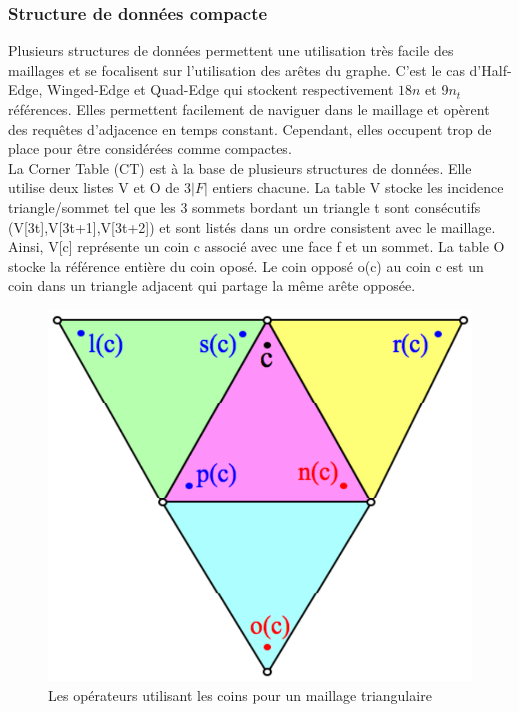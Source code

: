 \documentclass[a4paper,11pt,openany]{article}
\begin{document}
\subsubsection{Structure de données compacte}
\noindent
Plusieurs structures de données permettent une utilisation très facile des maillages et se focalisent sur l'utilisation des arêtes du graphe. C'est le cas d'Half-Edge, Winged-Edge et Quad-Edge qui stockent respectivement $18n$ et 9$n_t$ références. Elles permettent facilement de naviguer dans le maillage et opèrent des requêtes d'adjacence en temps constant. Cependant, elles occupent trop de place pour être considérées comme compactes.\\
La Corner Table (CT) est à la base de plusieurs structures de données. Elle utilise deux listes V et O de $3|F|$ entiers chacune. La table V stocke les incidence triangle/sommet tel que les 3 sommets bordant un triangle t sont consécutifs (V[3t],V[3t+1],V[3t+2]) et sont listés dans un ordre consistent avec le maillage. Ainsi, V[c] représente un coin c associé avec une face f et un sommet. La table O stocke la référence entière du coin oposé. Le coin opposé o(c) au coin c est un coin dans un triangle adjacent qui partage la même arête opposée.
\begin{figure}[H]
\begin{center}
\includegraphics[scale=0.2]{Images/corner_table}
\caption{Les opérateurs utilisant les coins pour un maillage triangulaire}
\label{fig:corner_table}
\end{center}
\end{figure}
\end{document}
